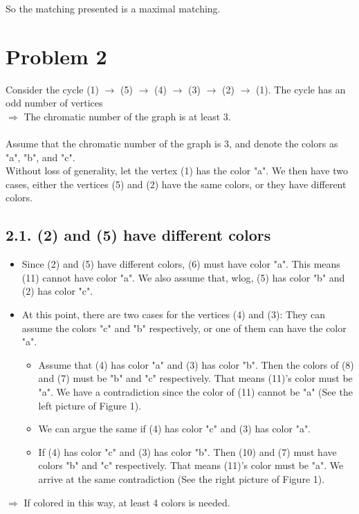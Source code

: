 \documentclass{article}
\begin{document}
So the matching presented is a maximal matching.
\pagebreak


\section*{Problem 2}
Consider the cycle (1) $\rightarrow$ (5) $\rightarrow$ (4) $\rightarrow$ (3) $\rightarrow$ (2) $\rightarrow$ (1). The cycle has an odd number of vertices \\
$\Rightarrow$ The chromatic number of the graph is at least 3. \\\\
Assume that the chromatic number of the graph is 3, and denote the colors as "a", "b", and "c". \\
Without loss of generality, let the vertex (1) has the color "a". We then have two cases, either the vertices (5) and (2) have the same colors, or they have different colors. \\

\subsection*{2.1. (2) and (5) have different colors}
\begin{itemize}
    \item Since (2) and (5) have different colors, (6) must have color "a". This means (11) cannot have color "a". We also assume that, wlog, (5) has color "b" and (2) has color "c".
    \item At this point, there are two cases for the vertices (4) and (3): They can assume the colors "c" and "b" respectively, or one of them can have the color "a".
    \begin{itemize}
         \item Assume that (4) has color "a" and (3) has color "b". Then the colors of (8) and (7) must be "b" and "c" respectively. That means (11)'s color must be            "a". We have a contradiction since the color of (11) cannot be "a" (See the left picture of Figure 1).
         \item We can argue the same if (4) has color "c" and (3) has color "a".
         \item If (4) has color "c" and (3) has color "b". Then (10) and (7) must have colors "b" and "c" respectively. That means (11)'s color must be "a". We arrive at the same contradiction (See the right picture of Figure 1).
     \end{itemize}               
\end{itemize}
$\Rightarrow$ If colored in this way, at least 4 colors is needed.
\end{document}
